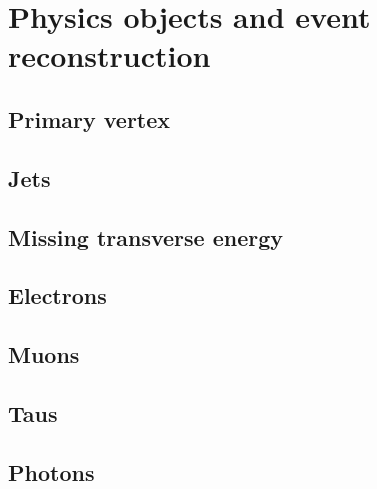 \chapter{Physics objects and event reconstruction}
\label{chap:obj}
\section{Primary vertex}
\label{sec:PV}

\section{Jets}
\label{sec:jets}

\section{Missing transverse energy}
\label{sec:MET}

\section{Electrons}
\label{sec:electrons}

\section{Muons}
\label{sec:muons}

\section{Taus}
\label{sec:taus}

\section{Photons} %
\label{sec:photons}
